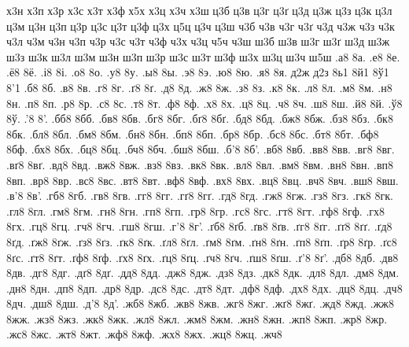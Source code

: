 {х3н
х3п
х3р
х3с
х3т
х3ф
х5х
х3ц
х3ч
х3ш
ц3б
ц3в
ц3г
ц3ґ
ц3д
ц3ж
ц3з
ц3к
ц3л
ц3м
ц3н
ц3п
ц3р
ц3с
ц3т
ц3ф
ц3х
ц5ц
ц3ч
ц3ш
ч3б
ч3в
ч3г
ч3ґ
ч3д
ч3ж
ч3з
ч3к
ч3л
ч3м
ч3н
ч3п
ч3р
ч3с
ч3т
ч3ф
ч3х
ч3ц
ч5ч
ч3ш
ш3б
ш3в
ш3г
ш3ґ
ш3д
ш3ж
ш3з
ш3к
ш3л
ш3м
ш3н
ш3п
ш3р
ш3с
ш3т
ш3ф
ш3х
ш3ц
ш3ч
ш5ш
.а8
8а.
.е8
8е.
.ё8
8ё.
.і8
8і.
.о8
8о.
.у8
8у.
.ы8
8ы.
.э8
8э.
.ю8
8ю.
.я8
8я.
д2ж
д2з
8ь1
8й1
8ў1
8'1
.б8
8б.
.в8
8в.
.г8
8г.
.ґ8
8ґ.
.д8
8д.
.ж8
8ж.
.з8
8з.
.к8
8к.
.л8
8л.
.м8
8м.
.н8
8н.
.п8
8п.
.р8
8р.
.с8
8с.
.т8
8т.
.ф8
8ф.
.х8
8х.
.ц8
8ц.
.ч8
8ч.
.ш8
8ш.
.й8
8й.
.ў8
8ў.
.'8
8'.
.бб8
8бб.
.бв8
8бв.
.бг8
8бг.
.бґ8
8бґ.
.бд8
8бд.
.бж8
8бж.
.бз8
8бз.
.бк8
8бк.
.бл8
8бл.
.бм8
8бм.
.бн8
8бн.
.бп8
8бп.
.бр8
8бр.
.бс8
8бс.
.бт8
8бт.
.бф8
8бф.
.бх8
8бх.
.бц8
8бц.
.бч8
8бч.
.бш8
8бш.
.б'8
8б'.
.вб8
8вб.
.вв8
8вв.
.вг8
8вг.
.вґ8
8вґ.
.вд8
8вд.
.вж8
8вж.
.вз8
8вз.
.вк8
8вк.
.вл8
8вл.
.вм8
8вм.
.вн8
8вн.
.вп8
8вп.
.вр8
8вр.
.вс8
8вс.
.вт8
8вт.
.вф8
8вф.
.вх8
8вх.
.вц8
8вц.
.вч8
8вч.
.вш8
8вш.
.в'8
8в'.
.гб8
8гб.
.гв8
8гв.
.гг8
8гг.
.гґ8
8гґ.
.гд8
8гд.
.гж8
8гж.
.гз8
8гз.
.гк8
8гк.
.гл8
8гл.
.гм8
8гм.
.гн8
8гн.
.гп8
8гп.
.гр8
8гр.
.гс8
8гс.
.гт8
8гт.
.гф8
8гф.
.гх8
8гх.
.гц8
8гц.
.гч8
8гч.
.гш8
8гш.
.г'8
8г'.
.ґб8
8ґб.
.ґв8
8ґв.
.ґг8
8ґг.
.ґґ8
8ґґ.
.ґд8
8ґд.
.ґж8
8ґж.
.ґз8
8ґз.
.ґк8
8ґк.
.ґл8
8ґл.
.ґм8
8ґм.
.ґн8
8ґн.
.ґп8
8ґп.
.ґр8
8ґр.
.ґс8
8ґс.
.ґт8
8ґт.
.ґф8
8ґф.
.ґх8
8ґх.
.ґц8
8ґц.
.ґч8
8ґч.
.ґш8
8ґш.
.ґ'8
8ґ'.
.дб8
8дб.
.дв8
8дв.
.дг8
8дг.
.дґ8
8дґ.
.дд8
8дд.
.дж8
8дж.
.дз8
8дз.
.дк8
8дк.
.дл8
8дл.
.дм8
8дм.
.дн8
8дн.
.дп8
8дп.
.др8
8др.
.дс8
8дс.
.дт8
8дт.
.дф8
8дф.
.дх8
8дх.
.дц8
8дц.
.дч8
8дч.
.дш8
8дш.
.д'8
8д'.
.жб8
8жб.
.жв8
8жв.
.жг8
8жг.
.жґ8
8жґ.
.жд8
8жд.
.жж8
8жж.
.жз8
8жз.
.жк8
8жк.
.жл8
8жл.
.жм8
8жм.
.жн8
8жн.
.жп8
8жп.
.жр8
8жр.
.жс8
8жс.
.жт8
8жт.
.жф8
8жф.
.жх8
8жх.
.жц8
8жц.
.жч8
}
